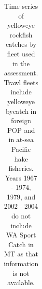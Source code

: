 \documentclass[
]{scrartcl}
\begin{document}
\begin{landscape}
\begingroup
\fontsize{9.0pt}{10.8pt}\selectfont

\begin{longtable}{>{\raggedleft\arraybackslash}p{\dimexpr 56.25pt -2\tabcolsep-1.5\arrayrulewidth}>{\raggedleft\arraybackslash}p{\dimexpr 56.25pt -2\tabcolsep-1.5\arrayrulewidth}>{\raggedleft\arraybackslash}p{\dimexpr 56.25pt -2\tabcolsep-1.5\arrayrulewidth}>{\raggedleft\arraybackslash}p{\dimexpr 56.25pt -2\tabcolsep-1.5\arrayrulewidth}>{\raggedleft\arraybackslash}p{\dimexpr 56.25pt -2\tabcolsep-1.5\arrayrulewidth}>{\raggedleft\arraybackslash}p{\dimexpr 56.25pt -2\tabcolsep-1.5\arrayrulewidth}>{\raggedleft\arraybackslash}p{\dimexpr 56.25pt -2\tabcolsep-1.5\arrayrulewidth}>{\raggedleft\arraybackslash}p{\dimexpr 56.25pt -2\tabcolsep-1.5\arrayrulewidth}>{\raggedleft\arraybackslash}p{\dimexpr 56.25pt -2\tabcolsep-1.5\arrayrulewidth}>{\raggedleft\arraybackslash}p{\dimexpr 56.25pt -2\tabcolsep-1.5\arrayrulewidth}}

\caption{\label{tbl-all_removals}Time series of yelloweye rockfish
catches by fleet used in the assessment. Trawl fleets include yelloweye
bycatch in foreign POP and in at-sea Pacific hake fisheries. Years 1967
- 1974, 1979, and 2002 - 2004 do not include WA Sport Catch in MT as
that information is not available.}

\tabularnewline


\end{longtable}
\end{landscape}
\end{document}
